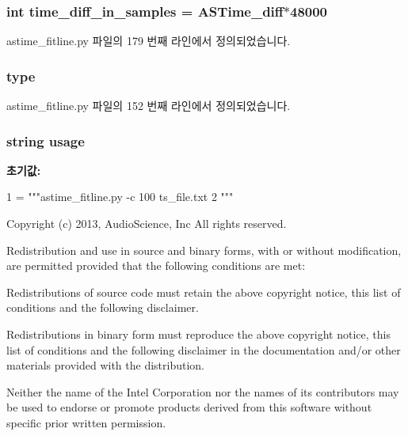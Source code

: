 \subsubsection[{\texorpdfstring{time\+\_\+diff\+\_\+in\+\_\+samples}{time_diff_in_samples}}]{\setlength{\rightskip}{0pt plus 5cm}int time\+\_\+diff\+\_\+in\+\_\+samples = {\bf A\+S\+Time\+\_\+diff}$\ast$48000}\hypertarget{namespaceastime__fitline_af985232d05940cd08456b712c92342ca}{}\label{namespaceastime__fitline_af985232d05940cd08456b712c92342ca}


astime\+\_\+fitline.\+py 파일의 179 번째 라인에서 정의되었습니다.

\subsubsection[{\texorpdfstring{type}{type}}]{\setlength{\rightskip}{0pt plus 5cm}type}\hypertarget{namespaceastime__fitline_a7aead736a07eaf25623ad7bfa1f0ee2d}{}\label{namespaceastime__fitline_a7aead736a07eaf25623ad7bfa1f0ee2d}


astime\+\_\+fitline.\+py 파일의 152 번째 라인에서 정의되었습니다.

\subsubsection[{\texorpdfstring{usage}{usage}}]{\setlength{\rightskip}{0pt plus 5cm}string usage}\hypertarget{namespaceastime__fitline_a61e5f066c879e5430d8f713c2c3a8b31}{}\label{namespaceastime__fitline_a61e5f066c879e5430d8f713c2c3a8b31}
{\bfseries 초기값\+:}
\begin{DoxyCode}
1 = \textcolor{stringliteral}{"""astime\_fitline.py -c 100 ts\_file.txt}
2 \textcolor{stringliteral}{"""}
\end{DoxyCode}


Copyright (c) 2013, Audio\+Science, Inc All rights reserved. 

Redistribution and use in source and binary forms, with or without modification, are permitted provided that the following conditions are met\+:


\begin{DoxyEnumerate}
\item Redistributions of source code must retain the above copyright notice, this list of conditions and the following disclaimer.
\item Redistributions in binary form must reproduce the above copyright notice, this list of conditions and the following disclaimer in the documentation and/or other materials provided with the distribution.
\item Neither the name of the Intel Corporation nor the names of its contributors may be used to endorse or promote products derived from this software without specific prior written permission.
\end{DoxyEnumerate}

